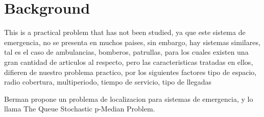 \section{Background}
This is a practical problem that has not been studied,
ya que este sistema de emergencia,
no se presenta en muchos paises,
sin embargo, hay sistemas similares,
tal es el caso de ambulancias, bomberos, patrullas,
para los cuales existen una gran cantidad de articulos al respecto,
pero las caracteristicas tratadas en ellos,
difieren de nuestro problema practico,
por los siguientes factores
tipo de espacio,
radio cobertura,
multiperiodo,
tiempo de servicio,
tipo de llegadas

Berman propone un problema de localizacion para sistemas de emergencia,
y lo llama The Queue Stochastic p-Median Problem.
